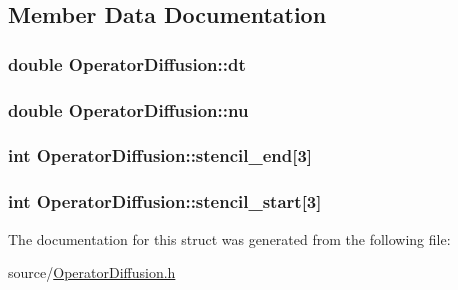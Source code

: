 \subsection{Member Data Documentation}
\hypertarget{struct_operator_diffusion_a8255ce1ebd90d30c4e4ec015280ae6ad}{}
\subsubsection[{dt}]{\setlength{\rightskip}{0pt plus 5cm}double Operator\+Diffusion\+::dt}\label{struct_operator_diffusion_a8255ce1ebd90d30c4e4ec015280ae6ad}
\hypertarget{struct_operator_diffusion_a332291d966d2088dc6f9183751975a3a}{}
\subsubsection[{nu}]{\setlength{\rightskip}{0pt plus 5cm}double Operator\+Diffusion\+::nu}\label{struct_operator_diffusion_a332291d966d2088dc6f9183751975a3a}
\hypertarget{struct_operator_diffusion_a42d733e46348f1fea002dfaa48913042}{}
\subsubsection[{stencil\+\_\+end}]{\setlength{\rightskip}{0pt plus 5cm}int Operator\+Diffusion\+::stencil\+\_\+end\mbox{[}3\mbox{]}}\label{struct_operator_diffusion_a42d733e46348f1fea002dfaa48913042}
\hypertarget{struct_operator_diffusion_a023c363d73e84e0a06be766a0aad85c6}{}
\subsubsection[{stencil\+\_\+start}]{\setlength{\rightskip}{0pt plus 5cm}int Operator\+Diffusion\+::stencil\+\_\+start\mbox{[}3\mbox{]}}\label{struct_operator_diffusion_a023c363d73e84e0a06be766a0aad85c6}


The documentation for this struct was generated from the following file\+:\begin{DoxyCompactItemize}
\item 
source/\hyperlink{_operator_diffusion_8h}{Operator\+Diffusion.\+h}\end{DoxyCompactItemize}
